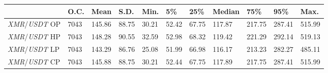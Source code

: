 \begin{tabular}{lllllllllll}
\toprule
 & \textbf{O.C.} & \textbf{Mean} & \textbf{S.D.} & \textbf{Min.} & \textbf{5\%} & \textbf{25\%} & \textbf{Median} & \textbf{75\%} & \textbf{95\%} & \textbf{Max.} \\
\midrule
\emph{XMR}/\emph{USDT} OP & 7043 & 145.86 & 88.75 & 30.21 & 52.42 & 67.75 & 117.87 & 217.75 & 287.41 & 515.99 \\
\emph{XMR}/\emph{USDT} HP & 7043 & 148.28 & 90.55 & 32.59 & 52.98 & 68.32 & 119.42 & 221.29 & 292.14 & 519.13 \\
\emph{XMR}/\emph{USDT} LP & 7043 & 143.29 & 86.76 & 25.08 & 51.99 & 66.98 & 116.17 & 213.23 & 282.27 & 485.11 \\
\emph{XMR}/\emph{USDT} CP & 7043 & 145.88 & 88.75 & 30.21 & 52.44 & 67.75 & 117.89 & 217.75 & 287.41 & 515.99 \\
\bottomrule
\end{tabular}
